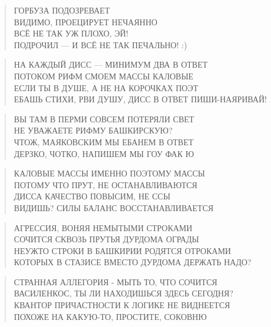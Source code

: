 \poemtitle{***}
\begin{verse}
ГОРБУЗА ПОДОЗРЕВАЕТ\\
ВИДИМО, ПРОЕЦИРУЕТ НЕЧАЯННО\\
ВСЁ НЕ ТАК УЖ ПЛОХО, ЭЙ!\\
ПОДРОЧИЛ — И ВСЁ НЕ ТАК ПЕЧАЛЬНО! :)
\end{verse}

\poemtitle{***}
\begin{verse}
НА КАЖДЫЙ ДИСС — МИНИМУМ ДВА В ОТВЕТ\\
ПОТОКОМ РИФМ СМОЕМ МАССЫ КАЛОВЫЕ\\
ЕСЛИ ТЫ В ДУШЕ, А НЕ НА КОРОЧКАХ ПОЭТ\\
ЕБАШЬ СТИХИ, РВИ ДУШУ, ДИСС В ОТВЕТ ПИШИ-НАЯРИВАЙ!
\end{verse}

\poemtitle{***}
\begin{verse}
ВЫ ТАМ В ПЕРМИ СОВСЕМ ПОТЕРЯЛИ СВЕТ\\
НЕ УВАЖАЕТЕ РИФМУ БАШКИРСКУЮ?\\
ЧТОЖ, МАЯКОВСКИМ МЫ ЕБАНЕМ В ОТВЕТ\\
ДЕРЗКО, ЧОТКО, НАПИШЕМ МЫ ГОУ ФАК Ю
\end{verse}

\poemtitle{***}
\begin{verse}
КАЛОВЫЕ МАССЫ ИМЕННО ПОЭТОМУ МАССЫ\\
ПОТОМУ ЧТО ПРУТ, НЕ ОСТАНАВЛИВАЮТСЯ\\
ДИССА КАЧЕСТВО ПОВЫСИМ, НЕ ССЫ\\
ВИДИШЬ? СИЛЫ БАЛАНС ВОССТАНАВЛИВАЕТСЯ
\end{verse}

\poemtitle{***}
\begin{verse}
АГРЕССИЯ, ВОНЯЯ НЕМЫТЫМИ СТРОКАМИ\\
СОЧИТСЯ СКВОЗЬ ПРУТЬЯ ДУРДОМА ОГРАДЫ\\
НЕУЖТО СТРОКИ В БАШКИРИИ РОДЯТСЯ ОТРОКАМИ\\
КОТОРЫХ В СТАЗИСЕ ВМЕСТО ДУРДОМА ДЕРЖАТЬ НАДО?
\end{verse}

\poemtitle{***}
\begin{verse}
СТРАННАЯ АЛЛЕГОРИЯ - МЫТЬ ТО, ЧТО СОЧИТСЯ\\
ВАСИЛЕНКОС, ТЫ ЛИ НАХОДИШЬСЯ ЗДЕСЬ СЕГОДНЯ?\\
КВАНТОР ПРИЧАСТНОСТИ К ЛОГИКЕ НЕ ВИДНЕЕТСЯ\\
ПОХОЖЕ НА КАКУЮ-ТО, ПРОСТИТЕ, СОКОВНЮ
\end{verse}

